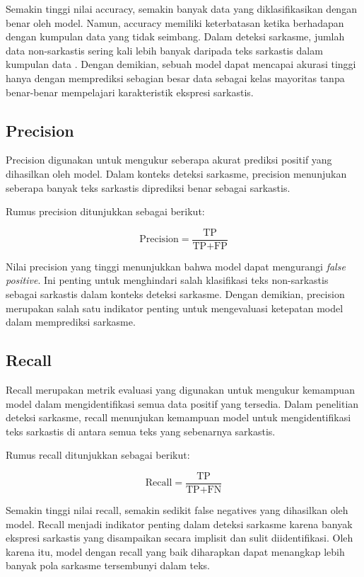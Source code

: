 Semakin tinggi nilai accuracy, semakin banyak data yang diklasifikasikan dengan benar oleh model. Namun, accuracy memiliki keterbatasan ketika berhadapan dengan kumpulan data yang tidak seimbang. Dalam deteksi sarkasme, jumlah data non-sarkastis sering kali lebih banyak daripada teks sarkastis dalam kumpulan data \cite{dhumpati2025sarcasm}. Dengan demikian, sebuah model dapat mencapai akurasi tinggi hanya dengan memprediksi sebagian besar data sebagai kelas mayoritas tanpa benar-benar mempelajari karakteristik ekspresi sarkastis.

\subsection{Precision}
Precision digunakan untuk mengukur seberapa akurat prediksi positif yang dihasilkan oleh model. Dalam konteks deteksi sarkasme, precision menunjukan seberapa banyak teks sarkastis diprediksi benar sebagai sarkastis.

Rumus precision ditunjukkan sebagai berikut:

\begin{equation}
\text{Precision} = \frac{\text{TP}}{\text{TP} + \text{FP}}
\end{equation}

Nilai precision yang tinggi menunjukkan bahwa model dapat mengurangi \textit{false positive}. Ini penting untuk menghindari salah klasifikasi teks non-sarkastis sebagai sarkastis dalam konteks deteksi sarkasme. Dengan demikian, precision merupakan salah satu indikator penting untuk mengevaluasi ketepatan model dalam memprediksi sarkasme.


\subsection{Recall}
Recall merupakan metrik evaluasi yang digunakan untuk mengukur kemampuan model dalam mengidentifikasi semua data positif yang tersedia. Dalam penelitian deteksi sarkasme, recall menunjukan kemampuan model untuk mengidentifikasi teks sarkastis di antara semua teks yang sebenarnya sarkastis. 

Rumus recall ditunjukkan sebagai berikut:

\begin{equation}
\text{Recall} = \frac{\text{TP}}{\text{TP} + \text{FN}}
\end{equation}

Semakin tinggi nilai recall, semakin sedikit false negatives yang dihasilkan oleh model. Recall menjadi indikator penting dalam deteksi sarkasme karena banyak ekspresi sarkastis yang disampaikan secara implisit dan sulit diidentifikasi. Oleh karena itu, model dengan recall yang baik diharapkan dapat menangkap lebih banyak pola sarkasme tersembunyi dalam teks.

